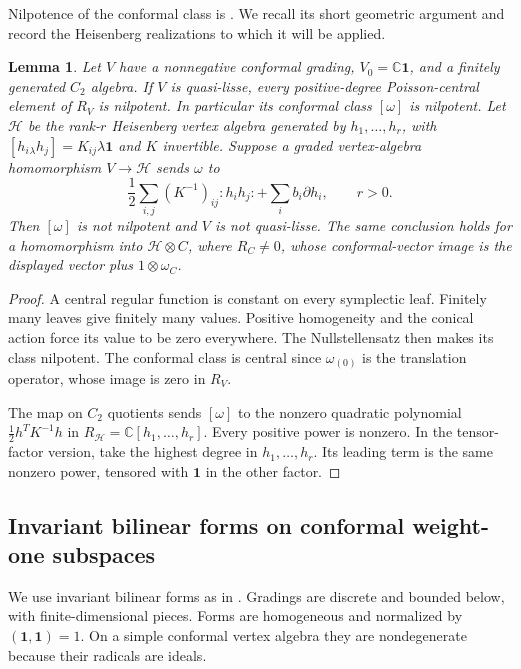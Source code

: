\documentclass[11pt,a4paper]{amsart}
\numberwithin{equation}{section}
\newtheorem{lemma}[theorem]{Lemma}
\theoremstyle{definition}
\theoremstyle{remark}
\newcommand{\C}{\mathbb C}
\begin{document}
Nilpotence of the conformal class is
\cite[Proposition~3.3]{AK}. We recall its short geometric argument
and record the Heisenberg realizations to which it will be applied.

\begin{lemma}
\label{com:conformal-obstruction}
Let $V$ have a nonnegative conformal grading, $V_0=\C\mathbf1$,
and a finitely generated $C_2$ algebra. If $V$ is quasi-lisse,
every positive-degree Poisson-central element of $R_V$ is
nilpotent. In particular its conformal class $[\omega]$ is
nilpotent. Let $\mathcal H$ be the rank-$r$ Heisenberg vertex
algebra generated by $h_1,\ldots,h_r$, with
$[h_i{}_{\lambda}h_j]=K_{ij}\lambda\mathbf1$ and $K$ invertible.
Suppose a graded vertex-algebra homomorphism $V\to\mathcal H$ sends $\omega$ to
$$
 \frac12\sum_{i,j}(K^{-1})_{ij}:h_ih_j:
                     +\sum_i b_i\partial h_i,
 \qquad r>0.
$$
Then $[\omega]$ is not nilpotent and $V$ is not quasi-lisse.
The same conclusion holds for a homomorphism into
$\mathcal H\otimes C$, where $R_C\ne0$, whose conformal-vector image is
the displayed vector plus $1\otimes\omega_C$.
\end{lemma}
\begin{proof}
A central regular function is constant on every symplectic leaf.
Finitely many leaves give finitely many values. Positive
homogeneity and the conical action force its value to be zero
everywhere. The Nullstellensatz then makes its class nilpotent.
The conformal class is central since $\omega_{(0)}$ is the
translation operator, whose image is zero in $R_V$.

The map on $C_2$ quotients sends $[\omega]$ to the nonzero
quadratic polynomial $\frac12h^TK^{-1}h$ in
$R_{\mathcal H}=\C[h_1,\ldots,h_r]$. Every positive power is
nonzero. In the tensor-factor version, take the highest degree
in $h_1,\ldots,h_r$. Its leading term is the same
nonzero power, tensored with $\mathbf1$ in the other factor.
\end{proof}

\subsection{Invariant bilinear forms on conformal weight-one subspaces}

We use invariant bilinear forms as in \cite{LiForms1994}. Gradings
are discrete and bounded below, with finite-dimensional pieces.
Forms are homogeneous and normalized by $(\mathbf1,\mathbf1)=1$.
On a simple conformal vertex algebra they are nondegenerate because
their radicals are ideals.
\end{document}
